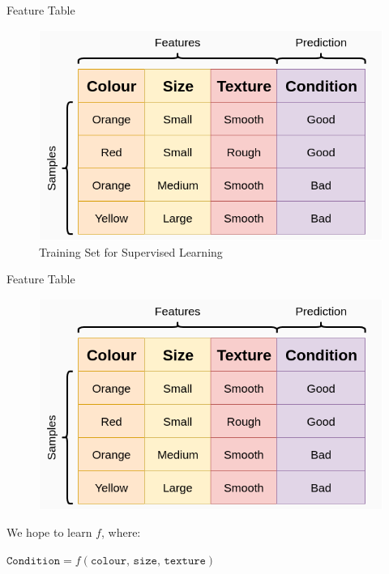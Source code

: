 \documentclass{beamer}
\begin{document}
\begin{frame}{Feature Table}
\begin{figure}[htp]
    \centering
    \includegraphics[width=0.7\linewidth]{accuracy/ml_2_accuracy_table_4.png}
    \caption{Training Set for Supervised Learning}
\end{figure}
\end{frame}

\begin{frame}{Feature Table}
\begin{figure}[htp]
    \centering
    \includegraphics[width=0.7\linewidth]{accuracy/ml_2_accuracy_table_4.png}
\end{figure}
We hope to learn $f$, where:
\begin{tcolorbox}
\begin{center}
$\texttt{Condition} = f(\texttt{colour, size, texture})$
\end{center}
\end{tcolorbox}
\end{frame}
\end{document}
